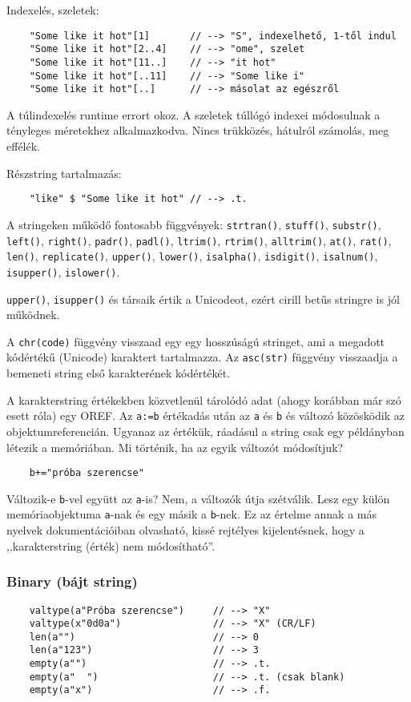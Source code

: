 Indexelés, szeletek:
\begin{verbatim}
    "Some like it hot"[1]       // --> "S", indexelhető, 1-től indul
    "Some like it hot"[2..4]    // --> "ome", szelet
    "Some like it hot"[11..]    // --> "it hot"
    "Some like it hot"[..11]    // --> "Some like i"
    "Some like it hot"[..]      // --> másolat az egészről
\end{verbatim}
A túlindexelés runtime errort okoz. 
A szeletek túllógó indexei módosulnak a tényleges méretekhez alkalmazkodva. 
Nincs trükközés, hátulról számolás, meg effélék.

Részstring tartalmazás:
\begin{verbatim}
    "like" $ "Some like it hot" // --> .t.
\end{verbatim}


A stringeken működő fontosabb függvények: 
\verb!strtran()!, 
\verb!stuff()!, 
\verb!substr()!, 
\verb!left()!, 
\verb!right()!, 
\verb!padr()!,
\verb!padl()!, 
\verb!ltrim()!, 
\verb!rtrim()!, 
\verb!alltrim()!, 
\verb!at()!, 
\verb!rat()!, 
\verb!len()!, 
\verb!replicate()!,
\verb!upper()!,
\verb!lower()!,
\verb!isalpha()!,
\verb!isdigit()!,
\verb!isalnum()!,
\verb!isupper()!,
\verb!islower()!.

\verb!upper()!, \verb!isupper()! és társaik értik a Unicodeot, 
ezért cirill betűs stringre is jól működnek.

A \verb!chr(code)! függvény visszaad egy egy hosszúságú stringet,
ami a megadott kódértékű (Unicode) karaktert tartalmazza.
Az \verb!asc(str)! függvény visszaadja a bemeneti string első karakterének
kódértékét.


A karakterstring értékekben közvetlenül tárolódó adat 
(ahogy korábban már szó esett róla) egy OREF. Az \verb!a:=b!
értékadás után az \verb!a! és \verb!b! és változó közösködik
az objektumreferencián. Ugyanaz az értékük, ráadásul a string csak egy 
példányban létezik a memóriában. Mi történik, ha az egyik változót módosítjuk?
\begin{verbatim}
    b+="próba szerencse"
\end{verbatim}
Változik-e \verb!b!-vel együtt az \verb!a!-is? Nem, a változók útja szétválik.
Lesz egy külön memóriaobjektuma \verb!a!-nak és egy másik a \verb!b!-nek.
Ez az értelme annak a más nyelvek dokumentációiban olvasható, kissé rejtélyes
kijelentésnek, hogy a ,,karakterstring (érték) nem módosítható''. 


\subsubsection{Binary (bájt string)}
\begin{verbatim}
    valtype(a"Próba szerencse")     // --> "X"
    valtype(x"0d0a")                // --> "X" (CR/LF)
    len(a"")                        // --> 0
    len(a"123")                     // --> 3
    empty(a"")                      // --> .t.
    empty(a"  ")                    // --> .t. (csak blank)
    empty(a"x")                     // --> .f.
\end{verbatim}

